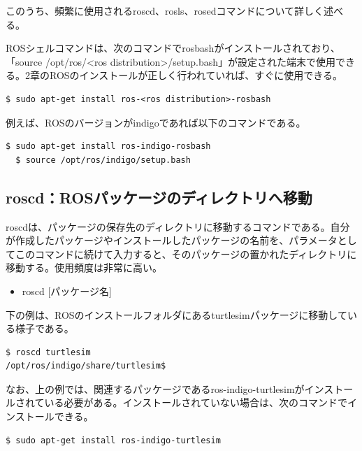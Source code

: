 このうち、頻繁に使用されるroscd、rosls、rosedコマンドについて詳しく述べる。

\begin{exercise}[ROSシェルコマンドを使用できる環境]
    ROSシェルコマンドは、次のコマンドでrosbashがインストールされており、「source /opt/ros/<ros distribution>/setup.bash」が設定された端末で使用できる。2章のROSのインストールが正しく行われていれば、すぐに使用できる。
  \begin{lstlisting}[language=ROS]
  $ sudo apt-get install ros-<ros distribution>-rosbash
  \end{lstlisting}
  例えば、ROSのバージョンがindigoであれば以下のコマンドである。
  \begin{lstlisting}[language=ROS]
  $ sudo apt-get install ros-indigo-rosbash
  $ source /opt/ros/indigo/setup.bash
  \end{lstlisting}
\end{exercise}

\subsection{roscd：ROSパッケージのディレクトリへ移動}

roscdは、パッケージの保存先のディレクトリに移動するコマンドである。自分が作成したパッケージやインストールしたパッケージの名前を、パラメータとしてこのコマンドに続けて入力すると、そのパッケージの置かれたディレクトリに移動する。使用頻度は非常に高い。

\begin{itemize}
\item roscd [パッケージ名]
\end{itemize}

下の例は、ROSのインストールフォルダにあるturtlesimパッケージに移動している様子である。

\begin{lstlisting}[language=ROS]
$ roscd turtlesim
/opt/ros/indigo/share/turtlesim$
\end{lstlisting}

なお、上の例では、関連するパッケージであるros-indigo-turtlesimがインストールされている必要がある。インストールされていない場合は、次のコマンドでインストールできる。

\begin{lstlisting}[language=ROS]
$ sudo apt-get install ros-indigo-turtlesim
\end{lstlisting}

